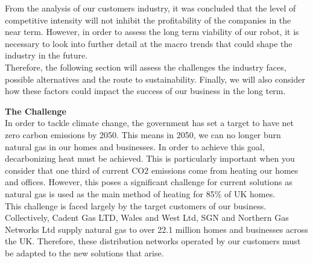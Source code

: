 \documentclass[11pt]{article}		%
\begin{document}
		From the analysis of our customers industry, it was concluded that the level of competitive intensity will not inhibit the profitability of the companies in the near term. However, in order to assess the long term viability of our robot, it is necessary to look into further detail at the macro trends that could shape the industry in the future.\\
	    \hspace*{3ex}Therefore, the following section will assess the challenges the industry faces, possible alternatives and the route to sustainability. Finally, we will also consider how these factors could impact the success of our business in the long term. 
	    
	    \textbf{The Challenge}\\
        In order to tackle climate change, the government has set a target to have net zero carbon emissions by 2050. This means in 2050, we can no longer burn natural gas in our homes and businesses. In order to achieve this goal, decarbonizing heat must be achieved. This is particularly important when you consider that one third of current CO2 emissions come from heating our homes and offices. However, this poses a significant challenge for current solutions as natural gas is used as the main method of heating for 85\% of UK homes.\\
        \hspace*{3ex}This challenge is faced largely by the target customers of our business. Collectively, Cadent Gas LTD, Wales and West Ltd, SGN and Northern Gas Networks Ltd supply natural gas to over 22.1 million homes and businesses across the UK. Therefore, these distribution networks operated by our customers must be adapted to the new solutions that arise. 
\end{document}
